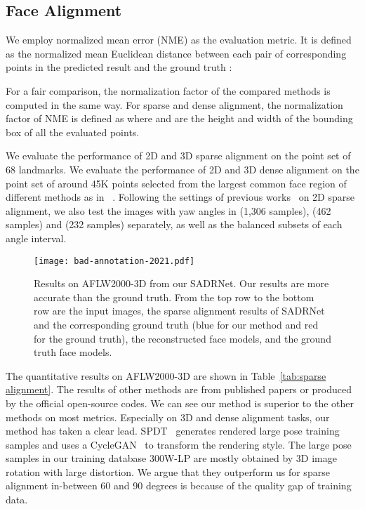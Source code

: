 \documentclass[journal]{IEEEtran}
\begin{document}
	
	\subsection{Face Alignment}
	We employ normalized mean error (NME) as the evaluation metric. It is defined as the normalized mean Euclidean distance between each pair of corresponding points in the predicted result  and the ground truth :
	
	For a fair comparison, the normalization factor  of the compared methods is computed in the same way. For sparse and dense alignment, the normalization factor of NME is defined as  where  and  are the height and width of the bounding box of all the evaluated points.
	
	We evaluate the performance of 2D and 3D sparse alignment on the point set of 68 landmarks. We evaluate the performance of 2D and 3D dense alignment on the point set of around 45K points selected from the largest common face region of different methods as in ~\cite{PRN}. Following the settings of previous works~\cite{PRN,3DDFA,FPS} on 2D sparse alignment, we also test the images with yaw angles in  (1,306 samples),  (462 samples) and  (232 samples) separately, as well as the balanced subsets of each angle interval.
	
	
	\begin{figure}[hpt]
		\centering
		\texttt{[image: bad-annotation-2021.pdf]}
		\caption{ Results on AFLW2000-3D from our SADRNet. Our results are more accurate than the ground truth. From the top row to the bottom row are the input images, the sparse alignment results of SADRNet and the corresponding ground truth (blue for our method and red for the ground truth), the reconstructed face models, and the ground truth face models.}
		\label{fig:fail}
	\end{figure}
	
	The quantitative results on AFLW2000-3D are shown in Table~\ref{tab:sparse alignment}. The results of other methods are from published papers or produced by the official open-source codes.
	We can see our method is superior to the other methods on most metrics. Especially on 3D and dense alignment tasks, our method has taken a clear lead.	
	SPDT~\cite{semi_2019_ICCV} generates rendered large pose training samples and uses a CycleGAN~\cite{cycle_gan_2017_ICCV} to transform the rendering style. The large pose samples in our training database 300W-LP are mostly obtained by 3D image rotation with large distortion. We argue that they outperform us for sparse alignment in-between 60 and 90 degrees is because of the quality gap of training data.
	
\end{document}
